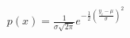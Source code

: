 \documentclass[preview]{standalone}
\begin{document}
\begin{align*}
p(x)=\frac{1}{\sigma \sqrt{2 \pi}} e^{-\frac{1}{2}\left(\frac{y_i-\mu}{\sigma}\right)^2}
\end{align*}
\end{document}
